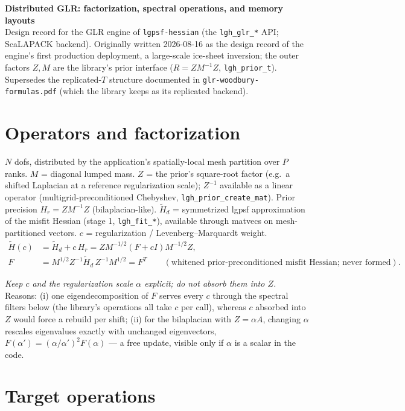 \documentclass[11pt]{article}
\newcommand{\Hd}{\widetilde{H}_d}
\newcommand{\Ht}{\widetilde{H}}
\begin{document}
\begin{center}
\textbf{Distributed GLR: factorization, spectral operations, and memory layouts}\\[2pt]
\small Design record for the GLR engine of \texttt{lgpsf-hessian} (the
\texttt{lgh\_glr\_*} API; ScaLAPACK backend).  Originally written 2026-08-16 as the
design record of the engine's first production deployment, a large-scale ice-sheet
inversion; the outer factors $Z, M$ are the library's prior interface
($R = Z M^{-1} Z$, \texttt{lgh\_prior\_t}).  Supersedes the replicated-$T$ structure
documented in \texttt{glr-woodbury-formulas.pdf} (which the library keeps as its
replicated backend).
\end{center}

\section{Operators and factorization}

$N$ dofs, distributed by the application's spatially-local mesh partition over $P$
ranks.  $M$ = diagonal lumped mass.  $Z$ = the prior's square-root factor (e.g.\ a
shifted Laplacian at a reference regularization scale); $Z^{-1}$ available as a
linear operator (multigrid-preconditioned Chebyshev, \texttt{lgh\_prior\_create\_mat}).
Prior precision $H_r = Z M^{-1} Z$ (bilaplacian-like).  $\Hd$ = symmetrized lgpsf
approximation of the misfit Hessian (stage 1, \texttt{lgh\_fit\_*}), available
through matvecs on mesh-partitioned vectors.  $c$ = regularization /
Levenberg--Marquardt weight.
\begin{align}
\Ht(c) &= \Hd + c\,H_r
        = Z M^{-1/2}\left( F + cI \right) M^{-1/2} Z,\\
F &= M^{1/2} Z^{-1} \Hd\, Z^{-1} M^{1/2} = F^T
        \qquad (\text{whitened prior-preconditioned misfit Hessian; never formed}).
\end{align}

\emph{Keep $c$ and the regularization scale $\alpha$ explicit; do not absorb them
into $Z$.}  Reasons: (i) one eigendecomposition of $F$ serves every $c$ through the
spectral filters below (the library's operations all take $c$ per call), whereas $c$
absorbed into $Z$ would force a rebuild per shift; (ii) for the bilaplacian with
$Z = \alpha A$, changing $\alpha$ rescales eigenvalues exactly with unchanged
eigenvectors, $F(\alpha') = (\alpha/\alpha')^2 F(\alpha)$ --- a free update, visible
only if $\alpha$ is a scalar in the code.

\section{Target operations}
\end{document}
